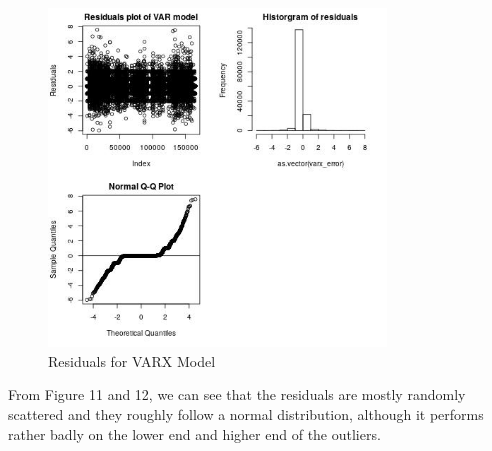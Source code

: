 \documentclass[nonblindrev,msom]{informs3} %
\begin{document}
\newpage
\begin{figure}[H]
    \centering
    \includegraphics[width=0.8\textwidth, height=0.42\textheight]{Images/Full_VARX_diff_resids.jpg}
    \caption{Residuals for VARX Model}
    \label{fig:Residuals for VARX Model}
\end{figure}

\noindent From Figure 11 and 12, we can see that the residuals are mostly randomly scattered and they roughly follow a normal distribution, although it performs rather badly on the lower end and higher end of the outliers. 


%
%
%
\end{document}
